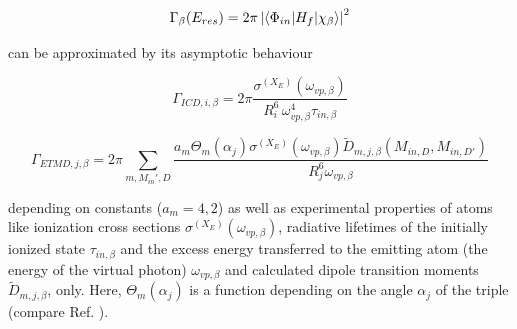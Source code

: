 \begin{equation}
 \Gamma_{\beta}(E_{res}) = 2\pi \left|
                           \braket{\Phi_{in}| H_f |\chi_{\beta}}
                           \right|^2
\end{equation}

can be approximated by its asymptotic behaviour

\begin{equation}
 \Gamma_{ICD,i,\beta} = 2\pi
                        \frac{\sigma^{(X_E)}(\omega_{vp,\beta})}
                        {R_i^6 \, \omega_{vp,\beta}^4 \tau_{in,\beta}}
\end{equation}


\begin{equation}
 \Gamma_{ETMD,j,\beta} = 2\pi \sum\limits_{m,M_{in}',D}
                        \frac{a_m \Theta_m(\alpha_j) \sigma^{(X_E)}(\omega_{vp,\beta})
                              \tilde{D}_{m,j,\beta}(M_{in,D},M_{in,D'})}
                         {R_j^6 \omega_{vp,\beta}}
\end{equation}

depending on constants ($a_m=4,2$) as well as experimental properties
of atoms like ionization cross sections
$\sigma^{(X_E)}(\omega_{vp,\beta})$, radiative lifetimes of the initially
ionized state $\tau_{in,\beta}$ and the excess energy transferred to the
emitting atom (the energy of the virtual photon) $\omega_{vp,\beta}$
and calculated dipole transition moments $\tilde{D}_{m,j,\beta}$, only.
Here, $\Theta_m(\alpha_j)$ is a function depending on the angle $\alpha_j$
of the triple (compare Ref. \cite{Fasshauer13}).

